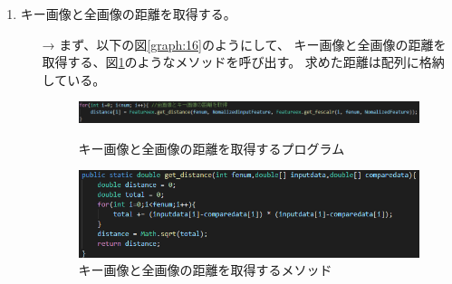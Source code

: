 \begin{enumerate}
  \item キー画像と全画像の距離を取得する。
  \begin{itemize}
    \item[→] まず、以下の図\ref{graph:16}のようにして、
    キー画像と全画像の距離を取得する、図\ref{graph:17}のようなメソッドを呼び出す。
    求めた距離は配列に格納している。
    \begin{figure}[htbp]
      \begin{minipage}[t]{0.45\hsize}
        \includegraphics[scale=0.3]{キー画像と全画像の距離を取得する.PNG}
        \centering
        \caption{キー画像と全画像の距離を取得するプログラム}
        \label{graph:16}
      \end{minipage}
      \begin{minipage}[t]{0.45\hsize}
        \includegraphics[scale=0.4]{キー画像と全画像の距離を取得する1.PNG}
        \centering
        \caption{キー画像と全画像の距離を取得するメソッド}
        \label{graph:17}
      \end{minipage}
    \end{figure}
  \end{itemize}
  

\end{enumerate}
